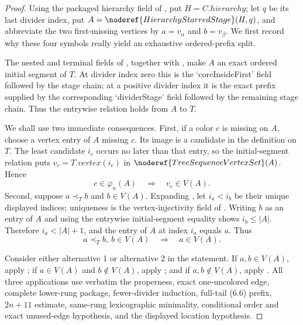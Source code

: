 \begin{proof}
Using the packaged hierarchy field of , put
$H=C.\mathit{hierarchy}$; let $q$ be its last divider index, put
$A=\noderef{HierarchyStarredStage}(H,q)$, and abbreviate the two
first-missing vertices by $a=v_\alpha$ and $b=v_\beta$.  We first record
why these four symbols really yield an exhaustive ordered-prefix split.

The nested and terminal fields of , together
with , make $A$ an exact ordered initial
segment of $T$.  At divider index zero this is the `coreInsideFirst'
field followed by the stage chain; at a positive divider index it is the
exact prefix supplied by the corresponding `dividerStage' field followed
by the remaining stage chain.  Thus the entrywise relation
 holds from $A$ to $T$.

We shall use two immediate consequences.  First, if a color $c$ is
missing on $A$, choose a vertex entry of $A$ missing $c$.  Its image is a
candidate in the definition  on
$T$.  The least candidate $i_c$ occurs no later than that entry, so the
initial-segment relation puts $v_c=T.\mathit{vertex}(i_c)$ in
$\noderef{TreeSequenceVertexSet}(A)$.  Hence
\[
 c\in\overline\varphi_n(A)\quad\Longrightarrow\quad v_c\in V(A).
                                                               \tag{1}
\]
Second, suppose $a\prec_T b$ and $b\in V(A)$.  Expanding
, let $i_a<i_b$ be their unique displayed
indices; uniqueness is the vertex-injectivity field of
.
Writing $b$ as an entry of $A$ and using the entrywise initial-segment
equality shows $i_b\leq |A|$.  Therefore $i_a<|A|+1$, and the entry of
$A$ at index $i_a$ equals $a$.  Thus
\[
              a\prec_T b,\ b\in V(A)\quad\Longrightarrow\quad a\in V(A).
                                                               \tag{2}
\]

Consider either alternative 1 or alternative 2 in the statement.  If
$a,b\in V(A)$, apply ; if
$a\in V(A)$ and $b\notin V(A)$, apply
; and if $a,b\notin V(A)$, apply
.  All three applications use verbatim
the properness, exact one-uncolored edge, complete lower-rung package,
fewer-divider induction, full-tail (6.6) prefix, $2n+11$ estimate,
same-rung lexicographic minimality, conditional order and exact unused-edge
hypothesis, and the displayed location hypothesis.


\end{proof}
